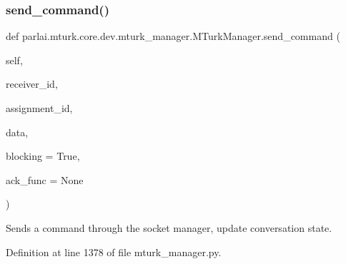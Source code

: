 \mbox{\label{classparlai_1_1mturk_1_1core_1_1dev_1_1mturk__manager_1_1MTurkManager_a4156d93d892d08db4b1fe1a27e5f9f3c}} 
\subsubsection{\texorpdfstring{send\+\_\+command()}{send\_command()}}
{\footnotesize\ttfamily def parlai.\+mturk.\+core.\+dev.\+mturk\+\_\+manager.\+M\+Turk\+Manager.\+send\+\_\+command (\begin{DoxyParamCaption}\item[{}]{self,  }\item[{}]{receiver\+\_\+id,  }\item[{}]{assignment\+\_\+id,  }\item[{}]{data,  }\item[{}]{blocking = {\ttfamily True},  }\item[{}]{ack\+\_\+func = {\ttfamily None} }\end{DoxyParamCaption})}

\begin{DoxyVerb}Sends a command through the socket manager, update conversation state.
\end{DoxyVerb}
 

Definition at line 1378 of file mturk\+\_\+manager.\+py.


